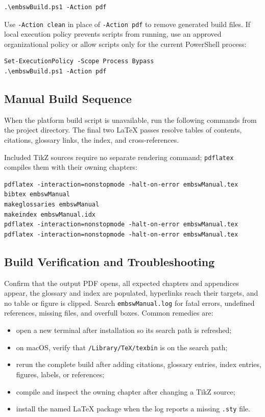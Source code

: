 \begin{verbatim}
.\embswBuild.ps1 -Action pdf
\end{verbatim}

Use \texttt{-Action clean} in place of \texttt{-Action pdf} to remove generated build files. If local execution policy prevents scripts from running, use an approved organizational policy or allow scripts only for the current PowerShell process:

\begin{verbatim}
Set-ExecutionPolicy -Scope Process Bypass
.\embswBuild.ps1 -Action pdf
\end{verbatim}

\subsection{Manual Build Sequence}

When the platform build script is unavailable, run the following commands from
the project directory. The final two LaTeX passes resolve tables of contents,
citations, glossary links, the index, and cross-references.

Included TikZ sources require no separate rendering command; \texttt{pdflatex}
compiles them with their owning chapters:

\begin{verbatim}
pdflatex -interaction=nonstopmode -halt-on-error embswManual.tex
bibtex embswManual
makeglossaries embswManual
makeindex embswManual.idx
pdflatex -interaction=nonstopmode -halt-on-error embswManual.tex
pdflatex -interaction=nonstopmode -halt-on-error embswManual.tex
\end{verbatim}

\subsection{Build Verification and Troubleshooting}

Confirm that the output PDF opens, all expected chapters and appendices appear,
the glossary and index are populated, hyperlinks reach their targets, and no
table or figure is clipped. Search \texttt{embswManual.log} for fatal errors,
undefined references, missing files, and overfull boxes. Common remedies are:

\begin{itemize}
\item open a new terminal after installation so its search path is refreshed;
\item on macOS, verify that \texttt{/Library/TeX/texbin} is on the search path;
\item rerun the complete build after adding citations, glossary entries, index
entries, figures, labels, or references;
\item compile and inspect the owning chapter after changing a TikZ source;
\item install the named LaTeX package when the log reports a missing
\texttt{.sty} file.
\end{itemize}

